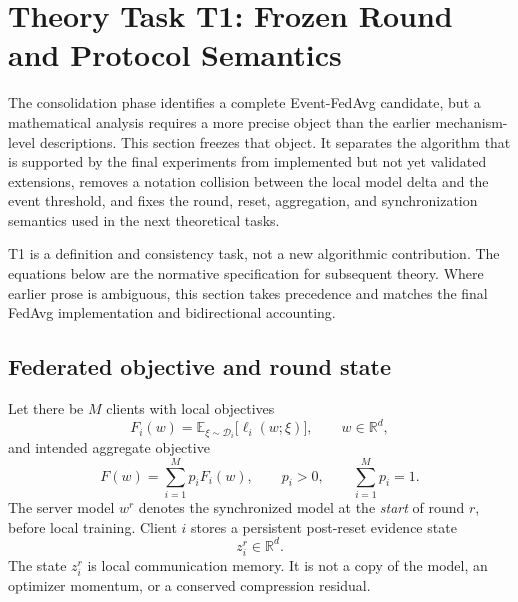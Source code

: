 \section{Theory Task T1: Frozen Round and Protocol Semantics}
\label{sec:theory-t1-formal-semantics}

The consolidation phase identifies a complete Event-FedAvg candidate, but a mathematical analysis requires a more precise object than the earlier mechanism-level descriptions. This section freezes that object. It separates the algorithm that is supported by the final experiments from implemented but not yet validated extensions, removes a notation collision between the local model delta and the event threshold, and fixes the round, reset, aggregation, and synchronization semantics used in the next theoretical tasks.

\begin{takeawaybox}[title={Status of this section}]
T1 is a definition and consistency task, not a new algorithmic contribution. The equations below are the normative specification for subsequent theory. Where earlier prose is ambiguous, this section takes precedence and matches the final FedAvg implementation and bidirectional accounting.
\end{takeawaybox}

\subsection{Federated objective and round state}

Let there be $M$ clients with local objectives
\begin{equation}
    F_i(w)=\mathbb{E}_{\xi\sim\mathcal{D}_i}
    \bigl[\ell_i(w;\xi)\bigr],
    \qquad
    w\in\mathbb{R}^d,
\end{equation}
and intended aggregate objective
\begin{equation}
    F(w)=\sum_{i=1}^{M}p_iF_i(w),
    \qquad
    p_i>0,
    \qquad
    \sum_{i=1}^{M}p_i=1.
    \label{eq:t1-global-objective}
\end{equation}
The server model $w^r$ denotes the synchronized model at the \emph{start} of round $r$, before local training. Client $i$ stores a persistent post-reset evidence state
\begin{equation}
    z_i^r\in\mathbb{R}^d.
\end{equation}
The state $z_i^r$ is local communication memory. It is not a copy of the model, an optimizer momentum, or a conserved compression residual.

